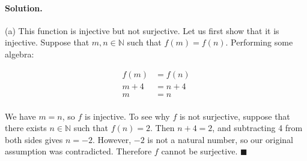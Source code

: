 \documentclass[12pt]{article}
\newenvironment{solution}{\paragraph{Solution.}}{\hfill$\blacksquare$}
\newcommand{\N}{\mathbb{N}}
\begin{document}
\begin{solution}
  (a) This function is injective but not surjective. Let us first show that it
  is injective. Suppose that $m, n \in \N$ such that $f(m) = f(n)$. Performing
  some algebra:

  \[
    \begin{aligned}
      f(m)  & = f(n)  \\
      m + 4 & = n + 4 \\
      m     & = n     \\
    \end{aligned}
  \]

  We have $m = n$, so $f$ is injective. To see why $f$ is not surjective,
  suppose that there exists $n \in \N$ such that $f(n) = 2$. Then $n + 4 = 2$,
  and subtracting 4 from both sides gives $n = -2$. However, $-2$ is not a
  natural number, so our original assumption was contradicted. Therefore $f$
  cannot be surjective.
\end{solution}
\end{document}
